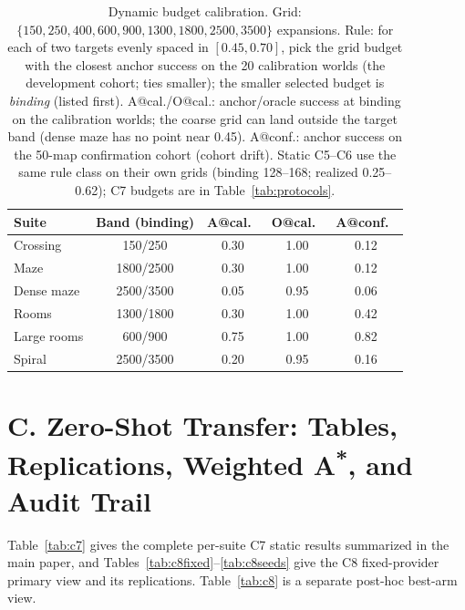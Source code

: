 \documentclass[letterpaper]{article} %
\newcommand{\stage}[1]{\textsc{#1}}
\begin{document}
\begin{table}[t]
\centering
\small
\setlength{\tabcolsep}{2.6pt}
\begin{tabular}{@{}lcccc@{}}
\toprule
Suite & Band (binding) & A@cal.\ & O@cal.\ & A@conf.\ \\
\midrule
Crossing & 150/250 & 0.30 & 1.00 & 0.12 \\
Maze & 1800/2500 & 0.30 & 1.00 & 0.12 \\
Dense maze & 2500/3500 & 0.05 & 0.95 & 0.06 \\
Rooms & 1300/1800 & 0.30 & 1.00 & 0.42 \\
Large rooms & 600/900 & 0.75 & 1.00 & 0.82 \\
Spiral & 2500/3500 & 0.20 & 0.95 & 0.16 \\
\bottomrule
\end{tabular}
\caption{Dynamic budget calibration. Grid: $\{150, 250, 400, 600, 900, 1300, 1800, 2500, 3500\}$ expansions. Rule: for each of two targets evenly spaced in $[0.45, 0.70]$, pick the grid budget with the closest anchor success on the 20 calibration worlds (the development cohort; ties smaller); the smaller selected budget is \emph{binding} (listed first). A@cal./O@cal.: anchor/oracle success at binding on the calibration worlds; the coarse grid can land outside the target band (dense maze has no point near 0.45). A@conf.: anchor success on the 50-map confirmation cohort (cohort drift). Static \stage{C5}--\stage{C6} use the same rule class on their own grids (binding 128--168; realized 0.25--0.62); \stage{C7} budgets are in Table~\ref{tab:protocols}.}
\label{tab:calib}
\end{table}

\clearpage
\section{C. Zero-Shot Transfer: Tables, Replications, Weighted A\textsuperscript{*}, and Audit Trail}

Table~\ref{tab:c7} gives the complete per-suite \stage{C7} static results summarized in the main paper, and Tables~\ref{tab:c8fixed}--\ref{tab:c8seeds} give the \stage{C8} fixed-provider primary view and its replications. Table~\ref{tab:c8} is a separate post-hoc best-arm view.
\end{document}
